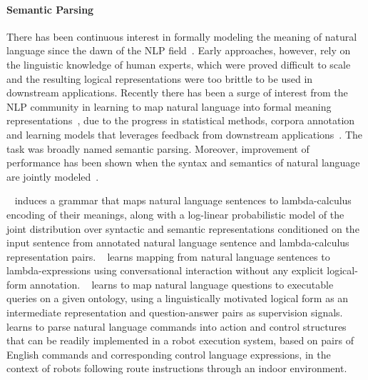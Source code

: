 \paragraph{Semantic Parsing} 
There has been continuous interest in formally modeling the meaning of natural language since the dawn of the NLP field~\cite{opac-b1080356}. Early approaches, however, rely on the linguistic knowledge of human experts, which were proved difficult to scale and the resulting logical representations were too brittle to be used in downstream applications. 
Recently there has been a surge of interest from the NLP community in learning to map natural language into formal meaning representations~\cite{Zettlemoyer05learningto,Kwiatkowski:2011:LGC:2145432.2145593,DBLP:Poon13}, due to the progress in statistical methods, corpora annotation and learning models that leverages feedback from downstream applications~\cite{artzi2013weakly}. The task was broadly named semantic parsing. Moreover, improvement of performance has been shown when the syntax and semantics of natural language are jointly modeled~\cite{Zettlemoyer05learningto,lewis2015joint}.

~\cite{Zettlemoyer05learningto} induces a grammar that maps natural language sentences to lambda-calculus encoding of their meanings, along with a log-linear probabilistic model of the joint distribution over syntactic and semantic representations conditioned on the input sentence from annotated natural language sentence and lambda-calculus representation pairs.
~\cite{Artzi:2011:BSP:2145432.2145481} learns mapping from natural language sentences to lambda-expressions using conversational interaction without any explicit logical-form annotation.
~\cite{kwiatkowski-EtAl:2013:EMNLP} learns to map natural language questions to executable queries on a given ontology, using a linguistically motivated logical form as an intermediate representation and question-answer pairs as supervision signals.
~\cite{conf/iser/MatuszekHZF12} learns to parse natural language commands into action and control structures that can be readily implemented in a robot execution system, based on pairs of English commands and corresponding control language expressions, in the context of robots following route instructions through an indoor environment.

